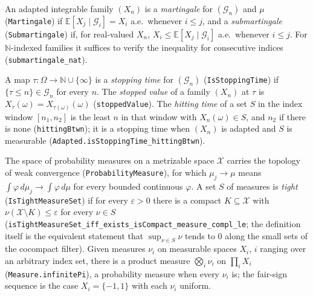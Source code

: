 \begin{definition}
An adapted integrable family $(X_n)$ is a \emph{martingale} for
$(\mathcal G_n)$ and $\mu$ (\texttt{Martingale}) if
$\mathbb E[X_j\mid\mathcal G_i]=X_i$ a.e.\ whenever $i\le j$, and a
\emph{submartingale} (\texttt{Submartingale}) if, for real-valued $X_n$,
$X_i\le\mathbb E[X_j\mid\mathcal G_i]$ a.e.\ whenever $i\le j$. For
$\mathbb N$-indexed families it suffices to verify the inequality for
consecutive indices (\texttt{submartingale\_nat}).
\end{definition}

\begin{definition}
A map $\tau:\Omega\to\mathbb N\cup\{\infty\}$ is a \emph{stopping time} for
$(\mathcal G_n)$ (\texttt{IsStoppingTime}) if $\{\tau\le n\}\in\mathcal G_n$ for
every $n$. The \emph{stopped value} of a family $(X_n)$ at $\tau$ is
$X_\tau(\omega)=X_{\tau(\omega)}(\omega)$ (\texttt{stoppedValue}). The
\emph{hitting time} of a set $S$ in the index window $[n_1,n_2]$ is the least
$n$ in that window with $X_n(\omega)\in S$, and $n_2$ if there is none
(\texttt{hittingBtwn}); it is a stopping time when $(X_n)$ is adapted and $S$ is
measurable (\texttt{Adapted.isStoppingTime\_hittingBtwn}).
\end{definition}

\begin{definition}
The space of probability measures on a metrizable space $\mathcal X$ carries the
topology of weak convergence (\texttt{ProbabilityMeasure}), for which
$\mu_j\to\mu$ means $\int\varphi\,d\mu_j\to\int\varphi\,d\mu$ for every bounded
continuous $\varphi$. A set $S$ of measures is \emph{tight}
(\texttt{IsTightMeasureSet}) if for every $\varepsilon>0$ there is a compact
$K\subseteq\mathcal X$ with $\nu(\mathcal X\setminus K)\le\varepsilon$ for every
$\nu\in S$ (\texttt{isTightMeasureSet\_iff\_exists\_isCompact\_measure\_compl\_le};
the definition itself is the equivalent statement that $\sup_{\nu\in S}\nu$
tends to $0$ along the small sets of the cocompact filter). Given measures
$\nu_i$ on measurable spaces $X_i$, $i$ ranging over
an arbitrary index set, there is a product measure $\bigotimes_i\nu_i$ on
$\prod_iX_i$ (\texttt{Measure.infinitePi}), a probability measure when every
$\nu_i$ is; the fair-sign sequence is the case
$X_i=\{-1,1\}$ with each $\nu_i$ uniform.
\end{definition}

